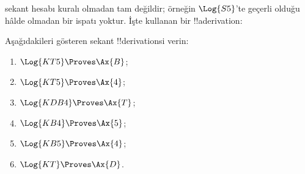 \begin{ex}
 sekant hesabı \Cut{} kuralı olmadan tam değildir; örneğin
$\Log{S5}$'te geçerli olduğu hâlde \Cut{} olmadan bir ispatı yoktur.
İşte \Cut{} kullanan bir !!a{derivation}:
\begin{prooftree}
\end{prooftree}
\end{ex}

\begin{prob}
Aşağıdakileri gösteren sekant !!{derivation}s{}i verin:
  \begin{enumerate}
  \item $\Log{KT5} \Proves \Ax{B}$;
  \item $\Log{KT5} \Proves \Ax{4}$;
  \item $\Log{KDB4} \Proves \Ax{T}$;
  \item $\Log{KB4} \Proves \Ax{5}$;
  \item $\Log{KB5} \Proves \Ax{4}$;
  \item $\Log{KT} \Proves \Ax{D}$.
  \end{enumerate}
\end{prob}


